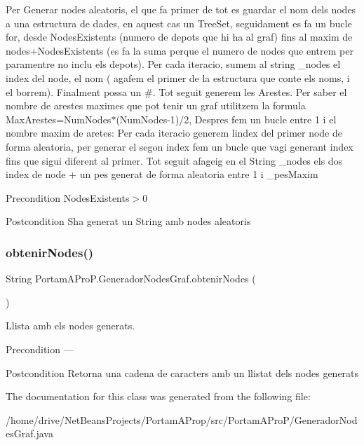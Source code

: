 Per Generar nodes aleatoris, el que fa primer de tot es guardar el nom dels nodes a una estructura de dades, en aquest cas un Tree\+Set, seguidament es fa un bucle for, desde Nodes\+Existents (numero de depots que hi ha al graf) fins al maxim de nodes+\+Nodes\+Existents (es fa la suma perque el numero de nodes que entrem per paramentre no inclu els depots). Per cada iteracio, sumem al string \+\_\+nodes el index del node, el nom ( agafem el primer de la estructura que conte els noms, i el borrem). Finalment possa un \#. Tot seguit generem les Arestes. Per saber el nombre de arestes maximes que pot tenir un graf utilitzem la formula Max\+Arestes=Num\+Nodes$\ast$(Num\+Nodes-\/1)/2, Despres fem un bucle entre 1 i el nombre maxim de aretes\+: Per cada iteracio generem l\textquotesingle{}index del primer node de forma aleatoria, per generar el segon index fem un bucle que vagi generant index fins que sigui diferent al primer. Tot seguit afageig en el String \+\_\+nodes els dos index de node + un pes generat de forma aleatoria entre 1 i \+\_\+pes\+Maxim

\begin{DoxyPrecond}{Precondition}
Nodes\+Existents$>$0 
\end{DoxyPrecond}
\begin{DoxyPostcond}{Postcondition}
S\textquotesingle{}ha generat un String amb nodes aleatoris 
\end{DoxyPostcond}
\mbox{\label{class_portam_a_pro_p_1_1_generador_nodes_graf_a93b4ca31f2957719696490c11619de7c}} 
\subsubsection{\texorpdfstring{obtenir\+Nodes()}{obtenirNodes()}}
{\footnotesize\ttfamily String Portam\+A\+Pro\+P.\+Generador\+Nodes\+Graf.\+obtenir\+Nodes (\begin{DoxyParamCaption}{ }\end{DoxyParamCaption})}



Llista amb els nodes generats. 

\begin{DoxyPrecond}{Precondition}
--- 
\end{DoxyPrecond}
\begin{DoxyPostcond}{Postcondition}
Retorna una cadena de caracters amb un llistat dels nodes generats 
\end{DoxyPostcond}


The documentation for this class was generated from the following file\+:\begin{DoxyCompactItemize}
\item 
/home/drive/\+Net\+Beans\+Projects/\+Portam\+A\+Prop/src/\+Portam\+A\+Pro\+P/Generador\+Nodes\+Graf.\+java\end{DoxyCompactItemize}
